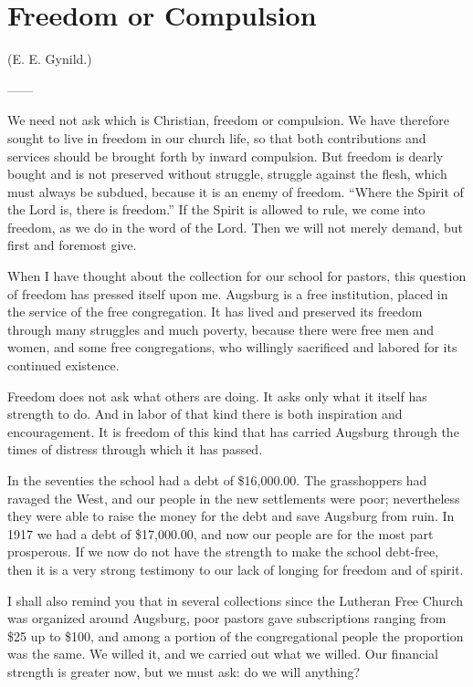 \section{Freedom or Compulsion}

(E. E. Gynild.)

——

We need not ask which is Christian, freedom or compulsion. We have therefore sought to live in freedom in our church life, so that both contributions and services should be brought forth by inward compulsion. But freedom is dearly bought and is not preserved without struggle, struggle against the flesh, which must always be subdued, because it is an enemy of freedom. “Where the Spirit of the Lord is, there is freedom.” If the Spirit is allowed to rule, we come into freedom, as we do in the word of the Lord. Then we will not merely demand, but first and foremost give.

When I have thought about the collection for our school for pastors, this question of freedom has pressed itself upon me. Augsburg is a free institution, placed in the service of the free congregation. It has lived and preserved its freedom through many struggles and much poverty, because there were free men and women, and some free congregations, who willingly sacrificed and labored for its continued existence.

Freedom does not ask what others are doing. It asks only what it itself has strength to do. And in labor of that kind there is both inspiration and encouragement. It is freedom of this kind that has carried Augsburg through the times of distress through which it has passed.

In the seventies the school had a debt of \$16,000.00. The grasshoppers had ravaged the West, and our people in the new settlements were poor; nevertheless they were able to raise the money for the debt and save Augsburg from ruin. In 1917 we had a debt of \$17,000.00, and now our people are for the most part prosperous. If we now do not have the strength to make the school debt-free, then it is a very strong testimony to our lack of longing for freedom and of spirit.

I shall also remind you that in several collections since the Lutheran Free Church was organized around Augsburg, poor pastors gave subscriptions ranging from \$25 up to \$100, and among a portion of the congregational people the proportion was the same. We willed it, and we carried out what we willed. Our financial strength is greater now, but we must ask: do we will anything?

